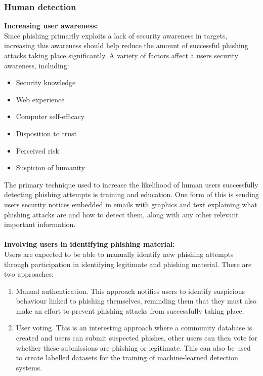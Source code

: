 \documentclass[11pt]{article}
\begin{document}
\subsubsection{Human detection}
\large{\textbf{Increasing user awareness:}}\\
Since phishing primarily exploits a lack of security awareness in targets, increasing this awareness should help reduce the amount of successful phishing attacks taking place significantly.
A variety of factors affect a users security awareness, including:
\begin{itemize}
\item Security knowledge
\item Web experience
\item Computer self-efficacy
\item Disposition to trust
\item Perceived risk
\item Suspicion of humanity
\end{itemize}
The primary technique used to increase the likelihood of human users successfully detecting phishing attempts is training and education.
One form of this is sending users security notices embedded in emails with graphics and text explaining what phishing attacks are and how to detect them, along with any other relevant important information.\\\\
\large{\textbf{Involving users in identifying phishing material:}}\\
Users are expected to be able to manually identify new phishing attempts through participation in identifying legitimate and phishing material.
There are two approaches:
\begin{enumerate}
\item Manual authentication. This approach notifies users to identify suspicious behaviour linked to phishing themselves, reminding them that they must also make an effort to prevent phishing attacks from successfully taking place.
\item User voting. This is an interesting approach where a community database is created and users can submit suspected phishes, other users can then vote for whether these submissions are phishing or legitimate. This can also be used to create labelled datasets for the training of machine-learned detection systems.
\end{enumerate}
\end{document}
